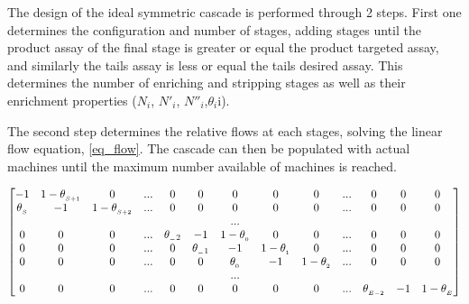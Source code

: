 The design of the ideal symmetric cascade is performed through 2 steps.  First
one determines the configuration and number of stages, adding stages until the
product assay of the final stage is greater or equal the product targeted assay,
and similarly the tails assay is less or equal the tails desired assay.  This
determines the number of enriching and stripping stages as well as their
enrichment properties ($N_{i}$, $N'_{i}$, $N''_{i}$,$\theta_{i}$i).


The second step determines the relative flows at each stages, solving the linear
flow equation, \eqref{eq_flow}.
The cascade can then be populated with actual machines until the maximum number
available of machines is reached.

\begin{equation}
\setcounter{MaxMatrixCols}{20}
\begin{bmatrix}
     -1      & 1-\theta_{_{S+1}} & 0                 & ...  & 0            & 0            & 0             & 0             & 0             & ... & 0               & 0  & 0 \\
\theta_{_S}  & -1                & 1-\theta_{_{S+2}} & ...  & 0            & 0            & 0             & 0             & 0             & ... & 0               & 0  & 0 \\
             &                   &                   &      &              &              & ...           &               &               &     &                 &    &   \\
 0           & 0                 & 0                 & ...  & \theta_{_-2} & -1           & 1-\theta_{_0} & 0             & 0             & ... & 0               & 0  & 0 \\
 0           & 0                 & 0                 & ...  & 0            & \theta_{_-1} & -1            & 1-\theta_{_1} & 0             & ... & 0               & 0  & 0 \\
 0           & 0                 & 0                 & ...  & 0            & 0            & \theta_{_0}   & -1            & 1-\theta_{_2} & ... & 0               & 0  & 0 \\
             &                   &                   &      &              &              & ...           &               &               &     &                 &    &   \\
 0           & 0                 & 0                 & ...  & 0            & 0            & 0             & 0             & 0             & ... & \theta_{_{E-2}} & -1 & 1-\theta_{_E} \\

\end{bmatrix}
\end{equation}
